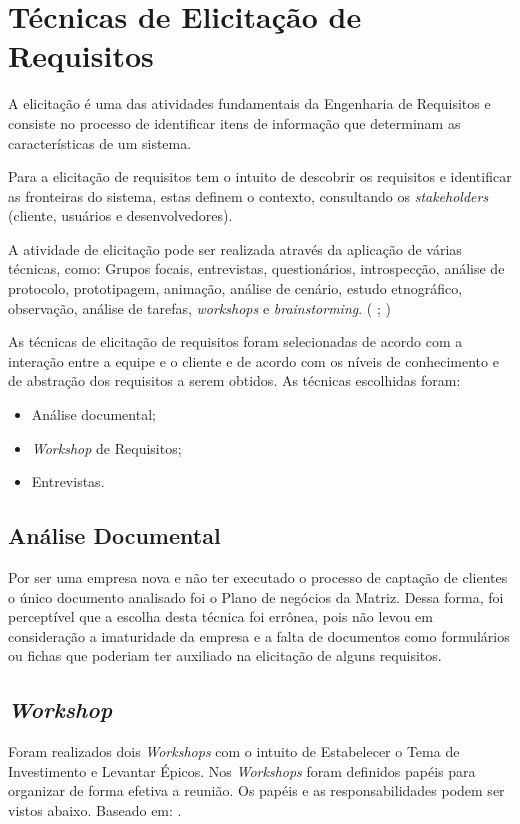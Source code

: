 \chapter[Técnicas de Elicitacao]{Técnicas de Elicitação de Requisitos}

A elicitação é uma das atividades fundamentais da Engenharia de Requisitos e consiste no processo de identificar
itens de informação que determinam as características de um sistema. \cite{jitnah} 

Para  a elicitação de requisitos tem o intuito de descobrir
os requisitos e identificar as fronteiras do sistema, estas definem o contexto, consultando os \textit{stakeholders} (cliente, usuários e desenvolvedores).

A atividade de elicitação pode ser realizada através da aplicação de várias técnicas, como: Grupos focais, entrevistas, questionários,
introspecção, análise de protocolo, prototipagem, animação, análise de cenário, estudo etnográfico, observação, análise de tarefas,
\textit{workshops} e \textit{brainstorming}. (\cite{jitnah} ; \cite{coulin})

\label{tecnicas}

As técnicas de elicitação de requisitos foram selecionadas de acordo com a interação entre a equipe e o cliente e de acordo com os níveis de conhecimento e de abstração dos requisitos a serem obtidos.
As técnicas escolhidas foram:\\
\begin{itemize}
\item Análise documental;
\item \textit{Workshop} de Requisitos;
\item Entrevistas.
\end{itemize}

\section{Análise Documental}
Por ser uma empresa nova e não ter executado o processo de captação de clientes o único documento analisado foi o Plano
de negócios da Matriz. Dessa forma, foi perceptível que a escolha desta técnica foi errônea, pois não levou
em consideração a imaturidade da empresa e a falta de documentos como formulários ou fichas que poderiam ter auxiliado
na elicitação de alguns requisitos.

\section{\textit{Workshop}}
  Foram realizados dois \textit{Workshops} com o intuito de Estabelecer o Tema de Investimento e Levantar Épicos. Nos \textit{Workshops}
  foram definidos papéis para organizar de forma efetiva a reunião. Os papéis e as responsabilidades podem ser vistos abaixo. Baseado em: .
  
